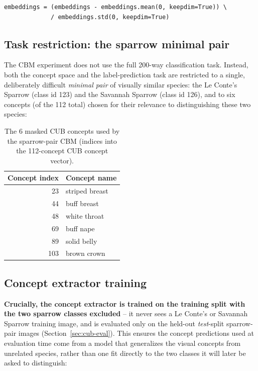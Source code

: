 \documentclass[11pt]{article}
\begin{document}
\begin{lstlisting}
embeddings = (embeddings - embeddings.mean(0, keepdim=True)) \
             / embeddings.std(0, keepdim=True)
\end{lstlisting}

\subsection{Task restriction: the sparrow minimal pair}
\label{sec:cub-restriction}

The CBM experiment does not use the full 200-way classification task.
Instead, both the concept space and the label-prediction task are
restricted to a single, deliberately difficult \emph{minimal pair} of
visually similar species: the Le Conte's Sparrow (class id 123) and the
Savannah Sparrow (class id 126), and to six concepts (of the 112 total)
chosen for their relevance to distinguishing these two species:

\begin{table}[h]
\centering
\begin{tabular}{rl}
\toprule
Concept index & Concept name \\
\midrule
23 & striped breast \\
44 & buff breast \\
48 & white throat \\
69 & buff nape \\
89 & solid belly \\
103 & brown crown \\
\bottomrule
\end{tabular}
\caption{The 6 masked CUB concepts used by the sparrow-pair CBM (indices into the 112-concept CUB concept vector).}
\end{table}

\subsection{Concept extractor training}

\textbf{Crucially, the concept extractor is trained on the training split
with the two sparrow classes excluded} -- it never sees a Le Conte's or
Savannah Sparrow training image, and is evaluated only on the held-out
\emph{test}-split sparrow-pair images (Section~\ref{sec:cub-eval}). This
ensures the concept predictions used at evaluation time come from a model
that generalizes the visual concepts from unrelated species, rather than
one fit directly to the two classes it will later be asked to distinguish:
\end{document}
